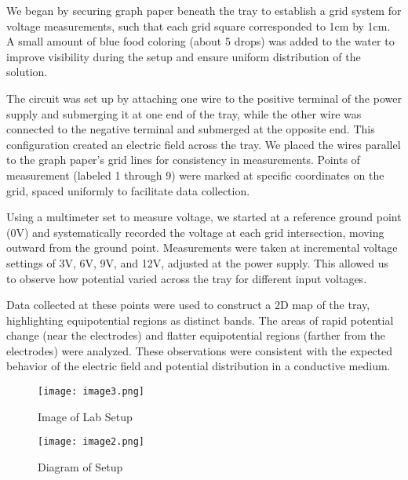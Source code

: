 \documentclass[conference]{IEEEtran}
\begin{document}
We began by securing graph paper beneath the tray to establish a grid system for voltage measurements, such that each grid square corresponded to 1cm by 1cm. A small amount of blue food coloring (about 5 drops) was added to the water to improve visibility during the setup and ensure uniform distribution of the solution.

The circuit was set up by attaching one wire to the positive terminal of the power supply and submerging it at one end of the tray, while the other wire was connected to the negative terminal and submerged at the opposite end. This configuration created an electric field across the tray. We placed the wires parallel to the graph paper's grid lines for consistency in measurements. Points of measurement (labeled 1 through 9) were marked at specific coordinates on the grid, spaced uniformly to facilitate data collection.

Using a multimeter set to measure voltage, we started at a reference ground point (0V) and systematically recorded the voltage at each grid intersection, moving outward from the ground point. Measurements were taken at incremental voltage settings of 3V, 6V, 9V, and 12V, adjusted at the power supply. This allowed us to observe how potential varied across the tray for different input voltages.

Data collected at these points were used to construct a 2D map of the tray, highlighting equipotential regions as distinct bands. The areas of rapid potential change (near the electrodes) and flatter equipotential regions (farther from the electrodes) were analyzed. These observations were consistent with the expected behavior of the electric field and potential distribution in a conductive medium.

\begin{figure}[ht]
    \centering
    \begin{minipage}{0.45\textwidth}
        \texttt{[image: image3.png]}
        \caption{Image of Lab Setup}
        \label{fig:setup}
    \end{minipage}
\end{figure}

\begin{figure}[ht]
    \centering
    \begin{minipage}{0.45\textwidth}
        \texttt{[image: image2.png]}
        \caption{Diagram of Setup}
        \label{fig:diagram}
    \end{minipage}
\end{figure}
\end{document}
